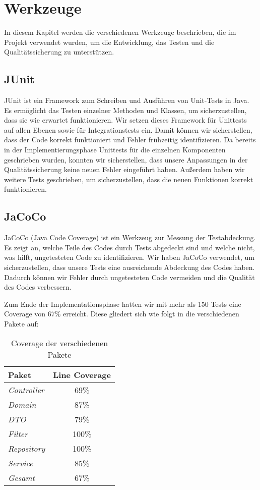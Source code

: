 
\chapter{Werkzeuge}
\label{ch:tools}

In diesem Kapitel werden die verschiedenen Werkzeuge beschrieben, die im Projekt verwendet wurden, um die Entwicklung, das Testen und die Qualitätssicherung zu unterstützen.

\section{JUnit}
JUnit ist ein Framework zum Schreiben und Ausführen von Unit-Tests in Java.
Es ermöglicht das Testen einzelner Methoden und Klassen, um sicherzustellen, dass sie wie erwartet funktionieren.
Wir setzen dieses Framework für Unittests auf allen Ebenen sowie für Integrationstests ein.
Damit können wir sicherstellen, dass der Code korrekt funktioniert und Fehler frühzeitig identifizieren.
Da bereits in der Implementierungsphase Unittests für die einzelnen Komponenten geschrieben wurden, konnten wir sicherstellen,
dass unsere Anpassungen in der Qualitätssicherung keine neuen Fehler eingeführt haben.
Außerdem haben wir weitere Tests geschrieben, um sicherzustellen, dass die neuen Funktionen korrekt funktionieren.

\section{JaCoCo}
JaCoCo (Java Code Coverage) ist ein Werkzeug zur Messung der Testabdeckung.
Es zeigt an, welche Teile des Codes durch Tests abgedeckt sind und welche nicht, was hilft, ungetesteten Code zu identifizieren.
Wir haben JaCoCo verwendet, um sicherzustellen, dass unsere Tests eine ausreichende Abdeckung des Codes haben.
Dadurch können wir Fehler durch ungetesteten Code vermeiden und die Qualität des Codes verbessern.

Zum Ende der Implementationsphase hatten wir mit mehr als 150 Tests eine Coverage von 67\% erreicht.
Diese gliedert sich wie folgt in die verschiedenen Pakete auf:

\begin{table}[h]
    \centering
    \renewcommand{\arraystretch}{1.3}
    \begin{tabular}{l|c}
        \textbf{Paket} & \textbf{Line Coverage} \\
        \hline
        \hline
        \textit{Controller}  & 69\% \\
        \textit{Domain}      & 87\% \\
        \textit{DTO}         & 79\% \\
        \textit{Filter}      & 100\% \\
        \textit{Repository}  & 100\% \\
        \textit{Service}     & 85\% \\
        \hline
        \textit{Gesamt}      & 67\% \\
    \end{tabular}
    \caption{Coverage der verschiedenen Pakete}
    \label{tab:progress_old}
\end{table}

